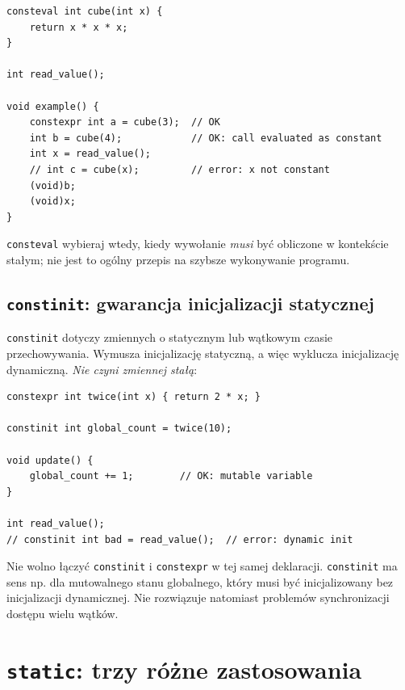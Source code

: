 \begin{lstlisting}
consteval int cube(int x) {
    return x * x * x;
}

int read_value();

void example() {
    constexpr int a = cube(3);  // OK
    int b = cube(4);            // OK: call evaluated as constant
    int x = read_value();
    // int c = cube(x);         // error: x not constant
    (void)b;
    (void)x;
}
\end{lstlisting}

\texttt{consteval} wybieraj wtedy, kiedy wywołanie \emph{musi}
być obliczone w kontekście stałym; nie jest to ogólny przepis
na szybsze wykonywanie programu.

\subsection{\texttt{constinit}: gwarancja inicjalizacji statycznej}

\texttt{constinit} dotyczy zmiennych o statycznym lub wątkowym czasie
przechowywania. Wymusza inicjalizację statyczną, a więc wyklucza
inicjalizację dynamiczną. \emph{Nie czyni zmiennej stałą}:

\begin{lstlisting}
constexpr int twice(int x) { return 2 * x; }

constinit int global_count = twice(10);

void update() {
    global_count += 1;        // OK: mutable variable
}

int read_value();
// constinit int bad = read_value();  // error: dynamic init
\end{lstlisting}

Nie wolno łączyć \texttt{constinit} i \texttt{constexpr} w tej samej
deklaracji. \texttt{constinit} ma sens np. dla mutowalnego stanu
globalnego, który musi być inicjalizowany bez inicjalizacji dynamicznej.
Nie rozwiązuje natomiast problemów synchronizacji dostępu wielu wątków.

\section{\texttt{static}: trzy różne zastosowania}


